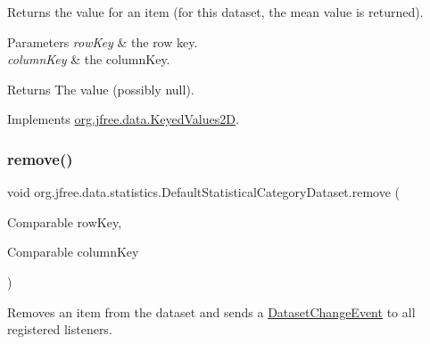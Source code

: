 Returns the value for an item (for this dataset, the mean value is returned).


\begin{DoxyParams}{Parameters}
{\em row\+Key} & the row key. \\
\hline
{\em column\+Key} & the column\+Key.\\
\hline
\end{DoxyParams}
\begin{DoxyReturn}{Returns}
The value (possibly {\ttfamily null}). 
\end{DoxyReturn}


Implements \mbox{\hyperlink{interfaceorg_1_1jfree_1_1data_1_1_keyed_values2_d_a61c450ca108cd99e53174fc91393a99a}{org.\+jfree.\+data.\+Keyed\+Values2D}}.

\mbox{\label{classorg_1_1jfree_1_1data_1_1statistics_1_1_default_statistical_category_dataset_a11ab7664991678352e203f8fd57a55d4}} 
\subsubsection{\texorpdfstring{remove()}{remove()}}
{\footnotesize\ttfamily void org.\+jfree.\+data.\+statistics.\+Default\+Statistical\+Category\+Dataset.\+remove (\begin{DoxyParamCaption}\item[{Comparable}]{row\+Key,  }\item[{Comparable}]{column\+Key }\end{DoxyParamCaption})}

Removes an item from the dataset and sends a \mbox{\hyperlink{}{Dataset\+Change\+Event}} to all registered listeners.


